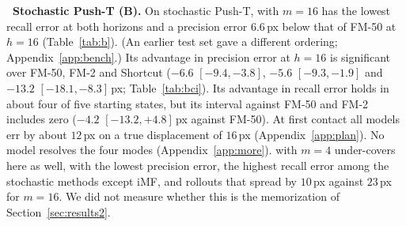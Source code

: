 \leavevmode{}\textbf{\thesubsection\ Stochastic Push-T (B).}
\label{sec:b}
On stochastic Push-T, \imlewm{} with $m{=}16$ has the lowest recall error at both horizons and a precision error $6.6$\,px below that of FM-50 at $h{=}16$ (Table~\ref{tab:b}). (An earlier test set gave a different ordering; Appendix~\ref{app:bench}.) Its advantage in precision error at $h{=}16$ is significant over FM-50, FM-2 and Shortcut ($-6.6$ $[-9.4, -3.8]$, $-5.6$ $[-9.3, -1.9]$ and $-13.2$ $[-18.1, -8.3]$\,px; Table~\ref{tab:bci}). Its advantage in recall error holds in about four of five starting states, but its interval against FM-50 and FM-2 includes zero ($-4.2$ $[-13.2, +4.8]$\,px against FM-50). At first contact all models err by about $12$\,px on a true displacement of $16$\,px (Appendix~\ref{app:plan}). No model resolves the four modes (Appendix~\ref{app:more}). \imlewm{} with $m{=}4$ under-covers here as well, with the lowest precision error, the highest recall error among the stochastic methods except iMF, and rollouts that spread by $10$\,px against $23$\,px for $m{=}16$. We did not measure whether this is the memorization of Section~\ref{sec:results2}.
